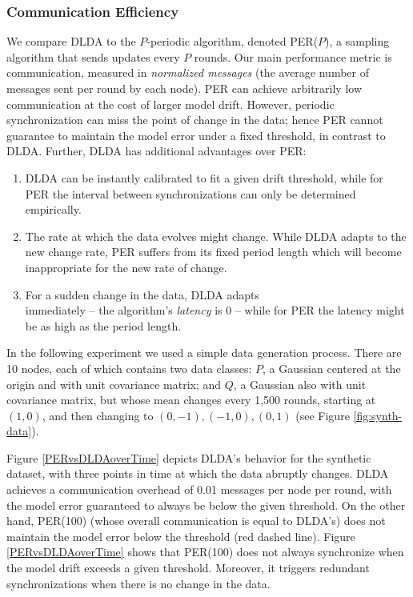 \subsubsection{Communication Efficiency}\label{sec:com_eff}
We compare DLDA to the $P$-periodic algorithm, denoted
PER($P$), a sampling algorithm that sends updates
every $P$ rounds.
Our main performance metric is communication, measured in \textit{normalized messages} (the average number of messages sent per round by each node). 
PER can achieve arbitrarily low communication at the cost of larger model drift. However,
periodic synchronization can miss the point of change in the data; 
hence PER cannot guarantee to maintain the model error under a fixed threshold, in contrast to DLDA.  Further,
DLDA has additional advantages over PER: 
\begin{enumerate}
\item DLDA can be instantly calibrated to fit a given drift threshold, while for PER the 
interval between synchronizations can only be determined empirically. 
\item The rate at which the data evolves might change. 
While DLDA adapts to the new change rate, PER suffers from its fixed period length
which will become inappropriate for the new rate of change.
\item For a sudden change in the data, DLDA adapts\\
immediately -- the algorithm's
\textit{latency} is 0 -- while for PER the latency might be as high as the period length.
\end{enumerate}
%
In the following experiment we used a simple data generation process. There are 
10 nodes, each of which contains two data classes: $P$, a Gaussian centered
at the origin and with unit covariance matrix; and $Q$, a Gaussian also
with unit covariance matrix, but whose mean changes every 1,500 rounds, starting 
at $(1,0)$, and then changing to $(0,-1), (-1,0), (0,1)$ (see 
Figure \ref{fig:synth-data}).



%
Figure \ref{PERvsDLDAoverTime} depicts DLDA's behavior for the synthetic dataset, with 
three points in time at which the data abruptly changes. 
DLDA achieves a communication overhead of 0.01 messages per node per round, with the model 
error guaranteed to always be below the given threshold.
On the other hand,  PER(100) (whose overall communication is equal to DLDA's) does not maintain the
model error below the threshold (red dashed line).
Figure \ref{PERvsDLDAoverTime} shows that PER(100) does not always 
synchronize when the model drift exceeds a given threshold. 
Moreover, it triggers redundant synchronizations when there is no change in the data.
%

